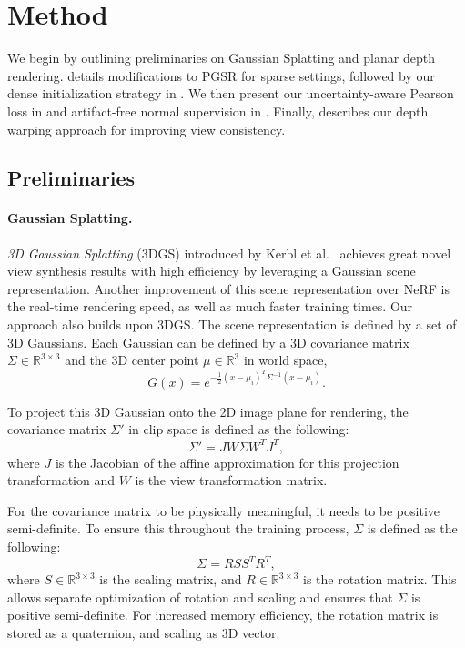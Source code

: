 \section{Method}
We begin by outlining preliminaries on Gaussian Splatting and planar depth rendering.  details modifications to PGSR for sparse settings, followed by our dense initialization strategy in . We then present our uncertainty-aware Pearson loss in  and artifact-free normal supervision in . Finally,  describes our depth warping approach for improving view consistency.

\subsection{Preliminaries}

\paragraph{Gaussian Splatting.}
\textit{3D Gaussian Splatting} (3DGS) introduced by Kerbl et al.~\cite{3dgs2023} achieves great novel view synthesis results with high efficiency by leveraging a Gaussian scene representation. Another improvement of this scene representation over NeRF is the real-time rendering speed, as well as much faster training times. Our approach also builds upon 3DGS.
The scene representation is defined by a set of 3D Gaussians.
Each Gaussian can be defined by a 3D covariance matrix $\Sigma \in \mathbb{R}^{3 \times 3}$ and the 3D center point $\mu \in \mathbb{R}^3$ in world space,
\begin{equation}
    G(x) = e^{-\frac{1}{2}(x - \mu_i)^T\Sigma^{-1}(x - \mu_i)}.
\end{equation}

To project this 3D Gaussian onto the 2D image plane for rendering, the covariance matrix $\Sigma'$ in clip space is defined as the following:
\begin{equation}
    \Sigma' = J W \Sigma W^T J^T,
\end{equation}
where $J$ is the Jacobian of the affine approximation for this projection transformation and $W$ is the view transformation matrix.

For the covariance matrix to be physically meaningful, it needs to be positive semi-definite.
To ensure this throughout the training process, $\Sigma$ is defined as the following:
\begin{equation}
    \Sigma = R S S^T R^T,
\end{equation}
where $S \in \mathbb{R}^{3\times 3}$ is the scaling matrix, and $R \in \mathbb{R}^{3\times 3}$ is the rotation matrix.
This allows separate optimization of rotation and scaling and ensures that $\Sigma$ is positive semi-definite. For increased memory efficiency, the rotation matrix is stored as a quaternion, and scaling as 3D vector.

